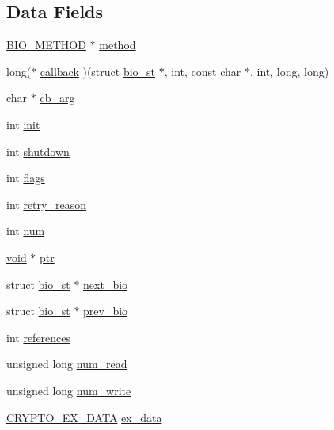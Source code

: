 \subsection*{Data Fields}
\begin{DoxyCompactItemize}
\item 
\hyperlink{crypto_2bio_2bio_8h_a2b58cec65ab7bb9eda7c86d707e687ca}{B\+I\+O\+\_\+\+M\+E\+T\+H\+OD} $\ast$ \hyperlink{structbio__st_afca6f07f18be333bc800f424875b0bdb}{method}
\item 
long($\ast$ \hyperlink{structbio__st_a4baeb597d07b933d0d4212ceb2caef04}{callback} )(struct \hyperlink{structbio__st}{bio\+\_\+st} $\ast$, int, const char $\ast$, int, long, long)
\item 
char $\ast$ \hyperlink{structbio__st_a95d787f037e2fc4bbbcdfe2fc658f2fe}{cb\+\_\+arg}
\item 
int \hyperlink{structbio__st_a795ea50921b36311ffd5e7baa2ef1f7e}{init}
\item 
int \hyperlink{structbio__st_a5161d377a61befc3f8103e794d5cb582}{shutdown}
\item 
int \hyperlink{structbio__st_ac8bf36fe0577cba66bccda3a6f7e80a4}{flags}
\item 
int \hyperlink{structbio__st_a0f03de3dae66a786602cf5b4d099706b}{retry\+\_\+reason}
\item 
int \hyperlink{structbio__st_a86cf672daa4e0ad11ad10efc894d19c8}{num}
\item 
\hyperlink{hw__4758__cca_8h_afad4d591c7931ff6dc5bf69c76c96aa0}{void} $\ast$ \hyperlink{structbio__st_aaf0497a3bd20a0066017546af6bf80be}{ptr}
\item 
struct \hyperlink{structbio__st}{bio\+\_\+st} $\ast$ \hyperlink{structbio__st_a4fbf53707f4e99358b07b8eccc9e1824}{next\+\_\+bio}
\item 
struct \hyperlink{structbio__st}{bio\+\_\+st} $\ast$ \hyperlink{structbio__st_ad3a3d13528e34c879a80347cf904e0ce}{prev\+\_\+bio}
\item 
int \hyperlink{structbio__st_a146fdb34d9a909e530adf8b189481195}{references}
\item 
unsigned long \hyperlink{structbio__st_a89f96b6ee80e1bafdc50124e75f166d8}{num\+\_\+read}
\item 
unsigned long \hyperlink{structbio__st_ae4c6903657e3e0bd66543a960bfbf881}{num\+\_\+write}
\item 
\hyperlink{crypto_2ossl__typ_8h_a7eaff1c18057495d8af18f22d1370b51}{C\+R\+Y\+P\+T\+O\+\_\+\+E\+X\+\_\+\+D\+A\+TA} \hyperlink{structbio__st_ac3e4fd59d6ee44a81f3a58114613c1e2}{ex\+\_\+data}
\end{DoxyCompactItemize}


